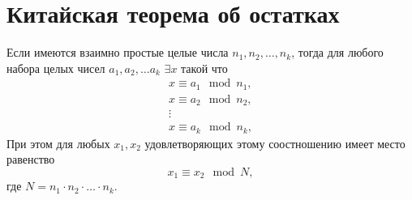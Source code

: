 \section{Китайская теорема об остатках}

\begin{theorem}
\label{thm:chineseremainder}
Если имеются взаимно простые целые числа $n_1, n_2, \dots, n_k$, тогда
для любого набора целых чисел $a_1, a_2, \dots a_k$ $\exists x$ такой
что 
\begin{eqnarray}
x \equiv a_1 \mod n_1,
\nonumber \\
x \equiv a_2 \mod n_2,
\nonumber \\
\vdots \nonumber \\
x \equiv a_k \mod n_k,
\end{eqnarray}
При этом для любых $x_1, x_2$ удовлетворяющих этому соостношению имеет
место равенство
\[
x_1 \equiv x_2 \mod N,
\]
где $N = n_1 \cdot n_2 \cdot \dots \cdot n_k$.
\end{theorem}
